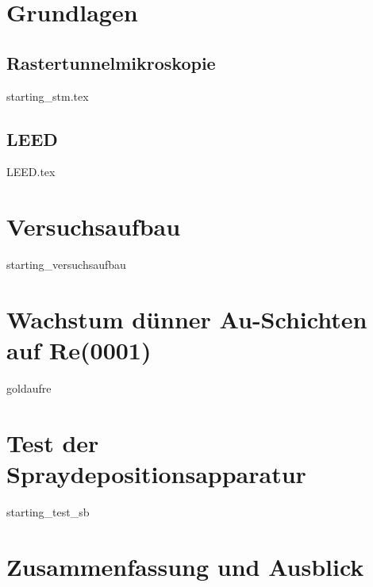 \documentclass[pdftex,a4paper,german,openbib,final,11pt,twoside,chapterprefix,
headsepline]{scrbook}
\begin{document}
\mainmatter  
\sloppy






\chapter{Grundlagen}


\section{Rastertunnelmikroskopie}
{starting_stm.tex}
 \section{LEED}
 {LEED.tex}


 \chapter{Versuchsaufbau} 
 {starting_versuchsaufbau}
 
\chapter{Wachstum dünner Au-Schichten auf Re(0001)}
{goldaufre}
 
\chapter{Test der Spraydepositionsapparatur} \label{kaptest}
{starting_test_sb}



% 
\chapter{Zusammenfassung und Ausblick}



% 
% 


{}



% 
\end{document}
